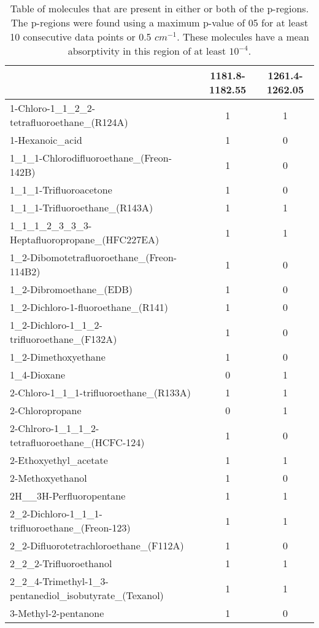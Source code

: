 \begin{longtable}{|l|c|c|} 
\caption{Table of molecules that are present in either or both of the p-regions. The p-regions were found using a maximum p-value of 05 for at least 10 consecutive data points or 0.5 $cm^{-1}$. These molecules have a mean absorptivity in this region of at least $10^{-4}$.\label{table:compound_region130molecules}}\\
\toprule
& \textbf{1181.8-1182.55} & \textbf{1261.4-1262.05}\\ \hline
\endhead
1-Chloro-1\_1\_2\_2-tetrafluoroethane\_(R124A) &1 &1\\ \hline
1-Hexanoic\_acid &1 &0\\ \hline
1\_1\_1-Chlorodifluoroethane\_(Freon-142B) &1 &0\\ \hline
1\_1\_1-Trifluoroacetone &1 &0\\ \hline
1\_1\_1-Trifluoroethane\_(R143A) &1 &1\\ \hline
1\_1\_1\_2\_3\_3\_3-Heptafluoropropane\_(HFC227EA) &1 &1\\ \hline
1\_2-Dibomotetrafluoroethane\_(Freon-114B2) &1 &0\\ \hline
1\_2-Dibromoethane\_(EDB) &1 &0\\ \hline
1\_2-Dichloro-1-fluoroethane\_(R141) &1 &0\\ \hline
1\_2-Dichloro-1\_1\_2-trifluoroethane\_(F132A) &1 &0\\ \hline
1\_2-Dimethoxyethane &1 &0\\ \hline
1\_4-Dioxane &0 &1\\ \hline
2-Chloro-1\_1\_1-trifluoroethane\_(R133A) &1 &1\\ \hline
2-Chloropropane &0 &1\\ \hline
2-Chlroro-1\_1\_1\_2-tetrafluoroethane\_(HCFC-124) &1 &0\\ \hline
2-Ethoxyethyl\_acetate &1 &1\\ \hline
2-Methoxyethanol &1 &0\\ \hline
2H\_\_3H-Perfluoropentane &1 &1\\ \hline
2\_2-Dichloro-1\_1\_1-trifluoroethane\_(Freon-123) &1 &1\\ \hline
2\_2-Difluorotetrachloroethane\_(F112A) &1 &0\\ \hline
2\_2\_2-Trifluoroethanol &1 &1\\ \hline
2\_2\_4-Trimethyl-1\_3-pentanediol\_isobutyrate\_(Texanol) &1 &1\\ \hline
3-Methyl-2-pentanone &1 &0\\ \hline

\end{longtable}
